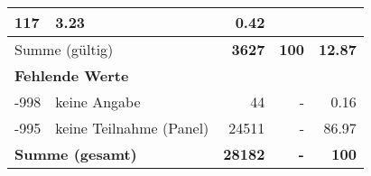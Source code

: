 \begin{longtable}{lXrrr}
       \num{117} &
       \num[round-mode=places,round-precision=2]{3.23} &
         \num[round-mode=places,round-precision=2]{0.42} \\
     \midrule
     \multicolumn{2}{l}{Summe (gültig)} &
       \textbf{\num{3627}} &
     \textbf{\num{100}} &
       \textbf{\num[round-mode=places,round-precision=2]{12.87}} \\
     \multicolumn{5}{l}{\textbf{Fehlende Werte}}\\
       -998 &
       keine Angabe &
         \num{44} &
        - &
         \num[round-mode=places,round-precision=2]{0.16} \\
       -995 &
       keine Teilnahme (Panel) &
         \num{24511} &
        - &
         \num[round-mode=places,round-precision=2]{86.97} \\
     \midrule
     \multicolumn{2}{l}{\textbf{Summe (gesamt)}} &
          \textbf{\num{28182}} &
        \textbf{-} &
        \textbf{\num{100}} \\
     \bottomrule
     \end{longtable}
     
